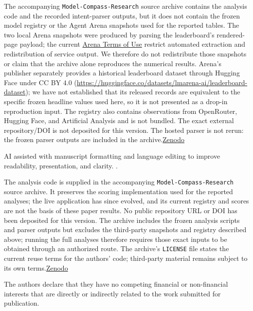 \documentclass[pdflatex,sn-mathphys-num]{sn-jnl}
\theoremstyle{thmstyleone}
\theoremstyle{thmstylethree}
\begin{document}
The accompanying \texttt{Model-Compass-Research} source archive contains the analysis code and the recorded intent-parser outputs, but it does not contain the frozen model registry or the Agent Arena snapshots used for the reported tables. The two local Arena snapshots were produced by parsing the leaderboard's rendered-page payload; the current \href{https://help.arena.ai/articles/5629909088-terms-of-use?lang=en}{Arena Terms of Use} restrict automated extraction and redistribution of service output. We therefore do not redistribute those snapshots or claim that the archive alone reproduces the numerical results. Arena's publisher separately provides a historical leaderboard dataset through Hugging Face under CC BY 4.0 (\url{https://huggingface.co/datasets/lmarena-ai/leaderboard-dataset}); we have not established that its released records are equivalent to the specific frozen headline values used here, so it is not presented as a drop-in reproduction input. The registry also contains observations from OpenRouter, Hugging Face, and Artificial Analysis and is not bundled. The exact external repository/DOI is not deposited for this version. The hosted parser is not rerun: the frozen parser outputs are included in the archive.\href{https://doi.org/10.5281/zenodo.23507047}{Zenodo}

AI assisted with manuscript formatting and language editing to improve readability, presentation, and clarity. .

The analysis code is supplied in the accompanying \texttt{Model-Compass-Research} source archive. It preserves the scoring implementation used for the reported analyses; the live application has since evolved, and its current registry and scores are not the basis of these paper results. No public repository URL or DOI has been deposited for this version. The archive includes the frozen analysis scripts and parser outputs but excludes the third-party snapshots and registry described above; running the full analyses therefore requires those exact inputs to be obtained through an authorized route. The archive's \texttt{LICENSE} file states the current reuse terms for the authors' code; third-party material remains subject to its own terms.\href{https://doi.org/10.5281/zenodo.23507047}{Zenodo}

The authors declare that they have no competing financial or non-financial interests that are directly or indirectly related to the work submitted for publication.
\end{document}
